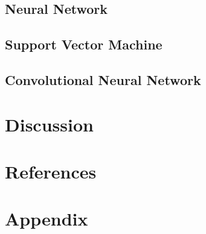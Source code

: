 \documentclass[10pt,twocolumn]{article}
\begin{document}
\subsection{Neural Network}
\subsection{Support Vector Machine}
\subsection{Convolutional Neural Network}
\section{Discussion}
\section{References}
\section{Appendix}
\end{document}
